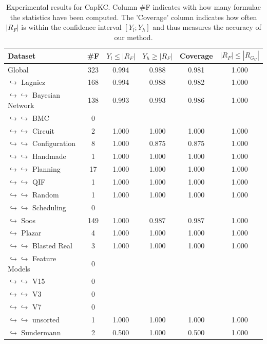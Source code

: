 \documentclass{article}
\newcommand\capkc[0]{CapKC\xspace}
\begin{document}
    
\begin{table}[h!]
        \centering
            \begin{tabular}{l|c|c|c|c|c}
                Dataset & \#F & $Y_l \leq |R_F|$ & $Y_h \geq |R_F|$ & Coverage & $|R_F| \leq |R_{G_U}|$ \\
                \hline
Global & 323 & 0.994 & 0.988 & 0.981 & 1.000 \\
$\hookrightarrow$ Lagniez \cite{D4} & 168 & 0.994 & 0.988 & 0.982 & 1.000 \\
$\hookrightarrow \hookrightarrow$ Bayesian Network & 138 & 0.993 & 0.993 & 0.986 & 1.000 \\
$\hookrightarrow \hookrightarrow$ BMC & 0 & & & \\
$\hookrightarrow \hookrightarrow$ Circuit & 2 & 1.000 & 1.000 & 1.000 & 1.000 \\
$\hookrightarrow \hookrightarrow$ Configuration & 8 & 1.000 & 0.875 & 0.875 & 1.000 \\
$\hookrightarrow \hookrightarrow$ Handmade & 1 & 1.000 & 1.000 & 1.000 & 1.000 \\
$\hookrightarrow \hookrightarrow$ Planning & 17 & 1.000 & 1.000 & 1.000 & 1.000 \\
$\hookrightarrow \hookrightarrow$ QIF & 1 & 1.000 & 1.000 & 1.000 & 1.000 \\
$\hookrightarrow \hookrightarrow$ Random & 1 & 1.000 & 1.000 & 1.000 & 1.000 \\
$\hookrightarrow \hookrightarrow$ Scheduling & 0 & & & \\
$\hookrightarrow$ Soos \cite{soos_2024_10449477} & 149 & 1.000 & 0.987 & 0.987 & 1.000 \\
$\hookrightarrow$ Plazar \cite{Plazar2019} & 4 & 1.000 & 1.000 & 1.000 & 1.000 \\
$\hookrightarrow \hookrightarrow$ Blasted Real & 3 & 1.000 & 1.000 & 1.000 & 1.000 \\
$\hookrightarrow \hookrightarrow$ Feature Models & 0 & & & \\
$\hookrightarrow \hookrightarrow$ V15 & 0 & & & \\
$\hookrightarrow \hookrightarrow$ V3 & 0 & & & \\
$\hookrightarrow \hookrightarrow$ V7 & 0 & & & \\
$\hookrightarrow \hookrightarrow$ unsorted & 1 & 1.000 & 1.000 & 1.000 & 1.000 \\
$\hookrightarrow$ Sundermann \cite{SBK+:SPLC24} & 2 & 0.500 & 1.000 & 0.500 & 1.000 \\
        \end{tabular}
        \caption{Experimental results for \capkc.
            Column \#F indicates with how many formulae the statistics have been computed.
            The 'Coverage' column indicates how often $|R_F|$ is within the confidence interval $[Y_l; Y_h]$ and thus measures the accuracy of our method.
        }
        \label{capkc:tab:appmc}
    \end{table}
\end{document}
